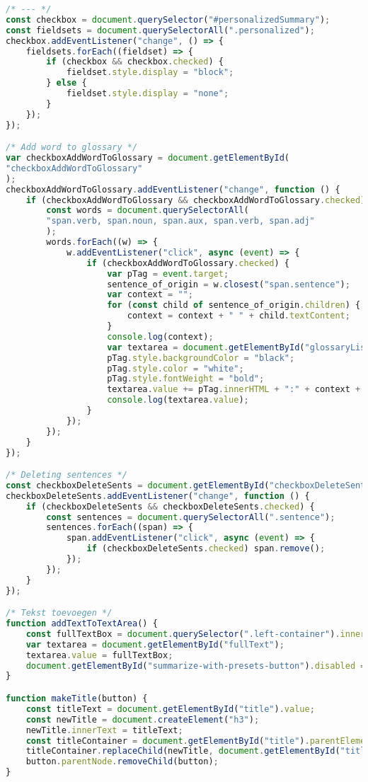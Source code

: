 \begin{lstlisting}[language=JavaScript, caption={De toegepaste scripts voor enkel het lerarencomponent.}, label={code:js-teachers}]
/* --- */
const checkbox = document.querySelector("#personalizedSummary");
const fieldsets = document.querySelectorAll(".personalized");
checkbox.addEventListener("change", () => {
	fieldsets.forEach((fieldset) => {
		if (checkbox && checkbox.checked) {
			fieldset.style.display = "block";
		} else {
			fieldset.style.display = "none";
		}
	});
});

/* Add word to glossary */
var checkboxAddWordToGlossary = document.getElementById(
"checkboxAddWordToGlossary"
);
checkboxAddWordToGlossary.addEventListener("change", function () {
	if (checkboxAddWordToGlossary && checkboxAddWordToGlossary.checked) {
		const words = document.querySelectorAll(
		"span.verb, span.noun, span.aux, span.verb, span.adj"
		);
		words.forEach((w) => {
			w.addEventListener("click", async (event) => {
				if (checkboxAddWordToGlossary.checked) {
					var pTag = event.target;
					sentence_of_origin = w.closest("span.sentence");
					var context = "";
					for (const child of sentence_of_origin.children) {
						context = context + " " + child.textContent;
					}
					console.log(context);
					var textarea = document.getElementById("glossaryList");
					pTag.style.backgroundColor = "black";
					pTag.style.color = "white";
					pTag.style.fontWeight = "bold";
					textarea.value += pTag.innerHTML + ":" + context + "\n";
					console.log(textarea.value);
				}
			});
		});
	}
});

/* Deleting sentences */
const checkboxDeleteSents = document.getElementById("checkboxDeleteSents");
checkboxDeleteSents.addEventListener("change", function () {
	if (checkboxDeleteSents && checkboxDeleteSents.checked) {
		const sentences = document.querySelectorAll(".sentence");
		sentences.forEach((span) => {
			span.addEventListener("click", async (event) => {
				if (checkboxDeleteSents.checked) span.remove();
			});
		});
	}
});

/* Tekst toevoegen */
function addTextToTextArea() {
	const fullTextBox = document.querySelector(".left-container").innerHTML;
	var textarea = document.getElementById("fullText");
	textarea.value = fullTextBox;
	document.getElementById("summarize-with-presets-button").disabled = false;
}

function makeTitle(button) {
	const titleText = document.getElementById("title").value;
	const newTitle = document.createElement("h3");
	newTitle.innerText = titleText;
	const titleContainer = document.getElementById("title").parentElement;
	titleContainer.replaceChild(newTitle, document.getElementById("title"));
	button.parentNode.removeChild(button);
}


\end{lstlisting}
